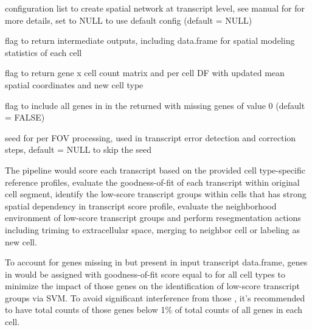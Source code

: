 \documentclass[letterpaper]{book}
\begin{document}
\begin{Arguments}
\begin{ldescription}
\item[\code{config\_spatNW\_transcript}] configuration list to create spatial network at transcript level, see manual for  for more details, set to NULL to use default config (default = NULL)

\item[\code{return\_intermediates}] flag to return intermediate outputs, including data.frame for spatial modeling statistics of each cell

\item[\code{return\_perCellData}] flag to return gene x cell count matrix and per cell DF with updated mean spatial coordinates and new cell type

\item[\code{includeAllRefGenes}] flag to include all genes in  in the returned  with missing genes of value 0 (default = FALSE)

\item[\code{seed\_process}] seed for per FOV processing, used in transcript error detection and correction steps, default = NULL to skip the seed
\end{ldescription}
\end{Arguments}
%
\begin{Details}
The pipeline would score each transcript based on the provided cell type-specific reference profiles, evaluate the goodness-of-fit of each transcript within original cell segment, identify the low-score transcript groups within cells that has strong spatial dependency in transcript score profile, evaluate the neighborhood environment of low-score transcript groups and perform resegmentation actions including triming to extracellular space, merging to neighbor cell or labeling as new cell.

To account for genes missing in  but present in input transcript data.frame, genes in  would be assigned with goodness-of-fit score equal to  for all cell types to minimize the impact of those genes on the identification of low-score transcript groups via SVM. To avoid significant interference from those , it's recommended to have total counts of those genes below 1\% of total counts of all genes in each cell.
\end{Details}
%
\end{document}
